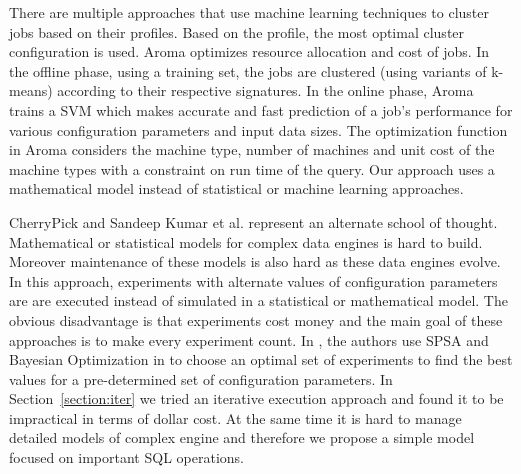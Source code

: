 There are multiple approaches \cite{wu2013self} \cite{lama2012aroma} that use machine learning techniques
to cluster jobs based on their profiles. Based on the profile, the most optimal cluster configuration is
used. Aroma \cite{lama2012aroma} optimizes resource allocation and cost of jobs. In
the offline phase, using a training set, the jobs are clustered
(using variants of k-means) according to their respective signatures.
In the online phase, Aroma trains a SVM which makes
accurate and fast prediction of a job's performance for various
configuration parameters and input data sizes. The optimization function in Aroma considers
the machine type, number of machines and unit cost of the machine types with a constraint on
run time of the query. Our approach uses a mathematical model instead of statistical or machine learning approaches. 
 
CherryPick\cite{Li:2014:MMO:2600212.2600229} and Sandeep Kumar et al.\cite{KumarPLPGB16} represent an alternate school of thought.
Mathematical or statistical models for complex data engines is hard to build. Moreover maintenance of these models 
is also hard as these data engines evolve. In this approach, experiments
with alternate values of configuration parameters are are executed instead of simulated in a 
statistical or mathematical model. The obvious disadvantage is that experiments cost money and the main 
goal of these approaches is to make every experiment count. In \cite{KumarPLPGB16}, the authors use SPSA and Bayesian Optimization in \cite{Li:2014:MMO:2600212.2600229} 
to choose an optimal set of experiments to find the best values for a pre-determined set of configuration parameters.
In Section~\ref{section:iter} we tried an iterative execution approach and found it to be impractical in terms of dollar cost. 
At the same time it is hard to manage detailed models of complex engine and therefore
we propose a simple model focused on important SQL operations.
  
